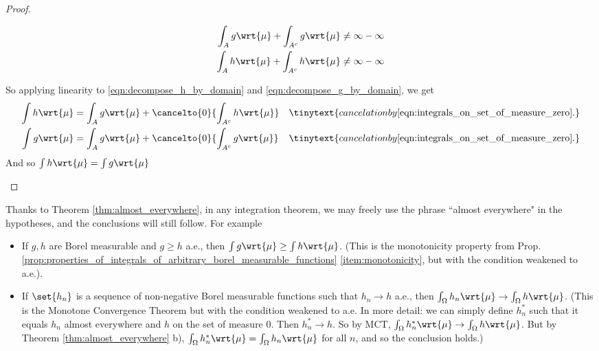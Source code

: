\documentclass{article} %
\newcommand{\dmu}{\wrt{\mu}}
\begin{document}
\begin{proof}
\begin{alphabate}
\begin{enumerate}
\begin{itemize}
		\begin{align*}
		\int_A g \dmu + \int_{A^c} g \dmu & \neq \infty - \infty \\
		\int_A h \dmu + \int_{A^c} h \dmu  & \neq \infty - \infty \\	
		\end{align*}
		\end{itemize}
		So applying linearity to \eqref{eqn:decompose_h_by_domain} and \eqref{eqn:decompose_g_by_domain}, we get 
		\begin{align*}
		\int h \dmu &= 	\int_A g \dmu + 	\cancelto{0}{\int_{A^c} h \dmu} && \tinytext{cancelation by \eqref{eqn:integrals_on_set_of_measure_zero}.} \\
		\int g \dmu &= 	\int_A g \dmu + 		\cancelto{0}{\int_{A^c} g \dmu} && \tinytext{cancelation by \eqref{eqn:integrals_on_set_of_measure_zero}.} \\
		\end{align*}
		And so $\int h \dmu = \int g \dmu$
		\end{enumerate}
	\end{alphabate}
\fi 
\end{proof}

\begin{remark}
	
Thanks to Theorem \ref{thm:almost_everywhere}, in any integration theorem, we may freely use the phrase ``almost everywhere" in the hypotheses, and the conclusions will still follow.  For example
\begin{itemize}
\item If $g,h$ are Borel measurable and $g \geq h$ a.e., then $\int g \dmu \geq \int h \dmu$.  {\tiny (This is the monotonicity property from Prop. \ref{prop:properties_of_integrals_of_arbitrary_borel_measurable_functions} \ref{item:monotonicity}, but with the condition weakened to a.e.). }
\item If $\set{h_n}$ is a sequence of non-negative Borel measurable functions such that $h_n \to h$ a.e., then $\int_\Omega h_n \dmu \to \int_\Omega h \dmu$. {\tiny (This is the Monotone Convergence Theorem but with the condition weakened to a.e.  In more detail: we can simply define $h^*_n$ such that it equals $h_n$ almost everywhere and $h$ on the set of measure 0.  Then $h^*_n \to h$.  So by MCT,  $\int_\Omega h^*_n \dmu \to \int_\Omega h \dmu$.  But by Theorem \ref{thm:almost_everywhere} b), $\int_\Omega h^*_n \dmu  = \int_\Omega h_n \dmu$ for all $n$, and so the conclusion holds.)  }
\end{itemize}
\end{remark}
\end{document}
